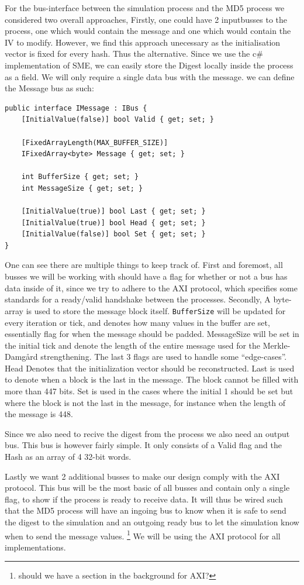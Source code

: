 \documentclass[a4paper]{article}
\begin{document}
\begin{enumerate}
For the bus-interface between the simulation process and the MD5 process we considered two overall approaches,
Firstly, one could have 2 inputbusses to the process, one which would contain the message and one which would contain the IV to modify. However, we find this approach unecessary as the initialisation vector is fixed for every hash. Thus the alternative. Since we use the c\# implementation of SME, we can easily store the Digest locally inside the process as a field. We will only require a single data bus with the message. we can define the Message bus as such:
\begin{verbatim}
public interface IMessage : IBus {
    [InitialValue(false)] bool Valid { get; set; }

    [FixedArrayLength(MAX_BUFFER_SIZE)]
    IFixedArray<byte> Message { get; set; }

    int BufferSize { get; set; }
    int MessageSize { get; set; }

    [InitialValue(true)] bool Last { get; set; }
    [InitialValue(true)] bool Head { get; set; }
    [InitialValue(false)] bool Set { get; set; }
}
\end{verbatim}
One can see there are multiple things to keep track of. First and foremost, all busses we will be working with should have a flag for whether or not a bus has data inside of it, since we try to adhere to the AXI protocol, which specifies some standards for a ready/valid handshake between the processes. Secondly, A byte-array is used to store the message block itself. \texttt{BufferSize} will be updated for every iteration or tick, and denotes how many values in the buffer are set, essentially flag for when the message should be padded. MessageSize will be set in the initial tick and denote the length of the entire message used for the Merkle-Damgård strengthening.
The last 3 flags are used to handle some ``edge-cases''.
Head Denotes that the initialization vector should be reconstructed.
Last is used to denote when a block is the last in the message. The block cannot be filled with more than 447 bits.
Set is used in the cases where the initial 1 should be set but where the block is not the last in the message, for instance when the length of the message is 448.

Since we also need to recive the digest from the process we also need an output bus. This bus is however fairly simple. It only consists of a Valid flag and the Hash as an array of 4 32-bit words.

Lastly we want 2 additional busses to make our design comply with the AXI protocol. This bus will be the most basic of all busses and contain only a single flag, to show if the process is ready to receive data. It will thus be wired such that the MD5 process will have an ingoing bus to know when it is safe to send the digest to the simulation and an outgoing ready bus to let the simulation know when to send the message values. \footnote{should we have a section in the background for AXI?} We will be using the AXI protocol for all implementations.


\end{enumerate}
\end{document}

